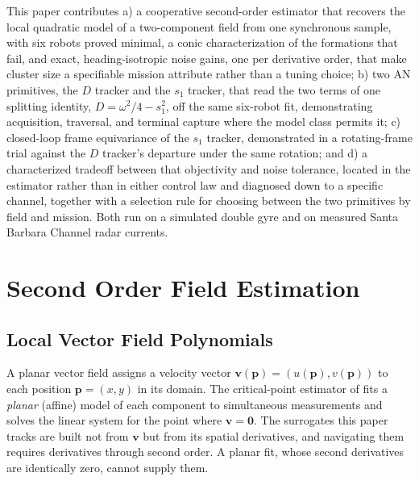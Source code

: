 \documentclass[lettersize,journal]{IEEEtran}
\begin{document}
This paper contributes a) a cooperative second-order estimator that
recovers the local quadratic model of a two-component field from one
synchronous sample, with six robots proved minimal, a conic
characterization of the formations that fail, and exact,
heading-isotropic noise gains, one per derivative order, that make
cluster size a specifiable mission attribute rather than a tuning
choice; b) two AN primitives, the $D$ tracker and the $s_1$ tracker,
that read the two terms of one splitting identity, $D = \omega^2/4 -
s_1^2$, off the same six-robot fit, demonstrating acquisition,
traversal, and terminal capture where the model class permits it;
c) closed-loop frame equivariance of the $s_1$ tracker, demonstrated
in a rotating-frame trial against the $D$ tracker's departure under the
same rotation; and d) a characterized tradeoff between that objectivity
and noise tolerance, located in the estimator rather than in either
control law and diagnosed down to a specific channel, together with a
selection rule for choosing between the two primitives by field and
mission. Both run on a simulated double gyre and on measured Santa
Barbara Channel radar currents.


\section{Second Order Field Estimation}

\subsection{Local Vector Field Polynomials}

A planar vector field assigns a velocity vector $\mathbf{v}(\mathbf{p}) =
(u(\mathbf{p}), v(\mathbf{p}))$ to each position $\mathbf{p} = (x, y)$ in its
domain. The critical-point estimator of \cite{8} fits a \emph{planar}
(affine) model of each component to simultaneous measurements and solves
the linear system for the point where $\mathbf{v} = \mathbf{0}$. The
surrogates this paper tracks are built not from $\mathbf{v}$ but from its
spatial derivatives, and navigating them requires derivatives through
second order. A planar fit, whose second derivatives are identically zero,
cannot supply them.
\end{document}
